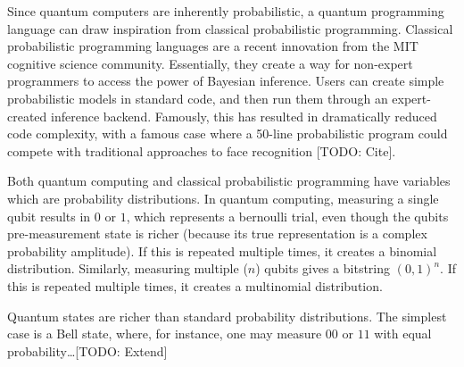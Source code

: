 \documentclass[journal]{IEEEtran}
\begin{document}
Since quantum computers are inherently probabilistic, a quantum programming language can draw inspiration from classical probabilistic programming.
Classical probabilistic programming languages are a recent innovation from the MIT cognitive science community. 
Essentially, they create a way for non-expert programmers to access the power of Bayesian inference. 
Users can create simple probabilistic models in standard code, and then run them through an expert-created inference backend.
Famously, this has resulted in dramatically reduced code complexity, with a famous case where a 50-line probabilistic program could compete with traditional approaches to face recognition [TODO: Cite].

Both quantum computing and classical probabilistic programming have variables which are probability distributions.
In quantum computing, measuring a single qubit results in $0$ or $1$, which represents a bernoulli trial, even though the qubits pre-measurement state is richer (because its true representation is a complex probability amplitude).
If this is repeated multiple times, it creates a binomial distribution.
Similarly, measuring multiple ($n$) qubits gives a bitstring $(0, 1)^n$. 
If this is repeated multiple times, it creates a multinomial distribution.

Quantum states are richer than standard probability distributions.
The simplest case is a Bell state, where, for instance, one may measure $00$ or $11$ with equal probability\dots [TODO: Extend]


\end{document}

